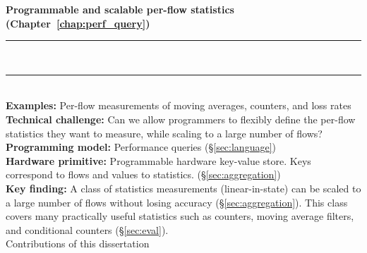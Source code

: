 \begin{table}
\textbf{Programmable and scalable per-flow statistics (Chapter~\ref{chap:perf_query})}
\\[-7pt]\rule{\textwidth}{1pt}\\[-7pt]\rule{\textwidth}{1pt} \\
\textbf{Examples:} Per-flow measurements of moving averages, counters, and loss rates \\
\textbf{Technical challenge:} Can we allow programmers to flexibly define the per-flow
statistics they want to measure, while scaling to a large number of flows?\\
\textbf{Programming model:} Performance queries (\S\ref{sec:language}) \\
\textbf{Hardware primitive:} Programmable hardware key-value store. Keys correspond to
flows and values to statistics. (\S\ref{sec:aggregation}) \\
\textbf{Key finding:} A class of statistics measurements (linear-in-state) can be scaled
to a large number of flows without losing accuracy (\S\ref{sec:aggregation}). This class
covers many practically useful statistics such as counters, moving average filters, and
conditional counters (\S\ref{sec:eval}). \\
\caption{Contributions of this dissertation}
\label{tab:contributions}
\end{table}

